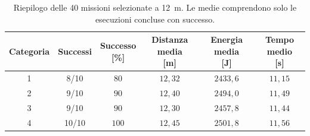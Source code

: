 \begin{table}[H]
\centering
\caption{Riepilogo delle 40 missioni selezionate a 12~m. Le medie comprendono solo le esecuzioni concluse con successo.}
\label{tab:big-map-12m-statistiche}
\small
\setlength{\tabcolsep}{5pt}
\begin{tabular}{@{}cccccc@{}}
\toprule
Categoria & Successi & \shortstack{Successo\\{}[\%]} & \shortstack{Distanza media\\{}[m]} & \shortstack{Energia media\\{}[J]} & \shortstack{Tempo medio\\{}[s]} \\
\midrule
1 & 8/10 & $80$ & $12{,}32$ & $2433{,}6$ & $11{,}15$ \\
2 & 9/10 & $90$ & $12{,}40$ & $2494{,}0$ & $11{,}49$ \\
3 & 9/10 & $90$ & $12{,}30$ & $2457{,}8$ & $11{,}44$ \\
4 & 10/10 & $100$ & $12{,}45$ & $2501{,}8$ & $11{,}56$ \\
\bottomrule
\end{tabular}
\end{table}
